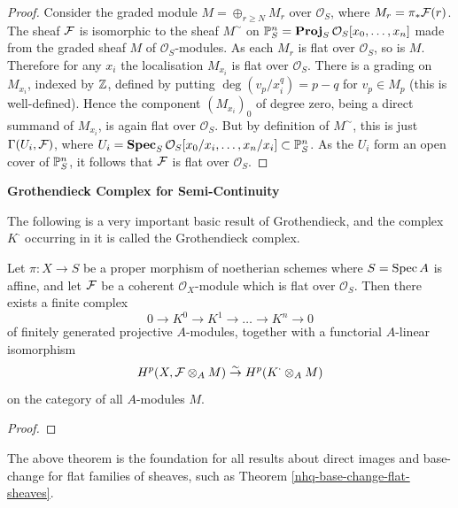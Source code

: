 \begin{proof} Consider the graded module $M = \oplus_{r\ge N} M_r$ over
${\mathcal O}_S$, where $M_r =  \pi_*\mathcal{F}(r)$. The sheaf $\mathcal{F}$ is isomorphic
to the sheaf $M^{\sim}$ on
$\mathbb{P}^n_S = {\bf Proj}_S\,{\mathcal O}_S[x_0,\ldots,x_n]$ made from the
graded sheaf $M$ of ${\mathcal O}_S$-modules.
As each $M_r$ is flat over ${\mathcal O}_S$, so is $M$. Therefore
for any $x_i$ the localisation $M_{x_i}$ is flat over ${\mathcal O}_S$.
There is a grading on $M_{x_i}$, indexed by $\mathbb{Z}$, defined
by putting $\deg(v_p/x_i^q) = p-q$ for $v_p \in M_p$ (this is well-defined).
Hence the component $(M_{x_i})_0$ of degree zero,
being a direct summand of $M_{x_i}$, is again
flat over ${\mathcal O}_S$. But by definition of $M^{\sim}$, this is just
$\Gamma(U_i,\mathcal{F})$, where $U_i = {\bf Spec}_S\,{\mathcal O}_S[x_0/x_i,\ldots,x_n/x_i]
\subset \mathbb{P}^n_S$. As the $U_i$ form an open cover of $\mathbb{P}^n_S$,
it follows that $\mathcal{F}$ is flat over ${\mathcal O}_S$. \end{proof}


\medskip

\centerline{\large\bf Grothendieck Complex for Semi-Continuity}

\medskip

The following is a very important basic result of Grothendieck,
and the complex $K^{\cdot}$ occurring in it is called the Grothendieck
complex.


\begin{theorem}\label{nhq-grothendieck-complex}
Let $\pi: X\to S$ be a proper morphism of noetherian
schemes where $S=\operatorname{Spec} A$ is affine,
and let $\mathcal{F}$ be a coherent ${\mathcal O}_X$-module
which is flat over ${\mathcal O}_S$. Then
there exists a finite complex
$$0\to K^0 \to K^1 \to \ldots \to K^n\to 0$$
of finitely generated projective $A$-modules, together with
a functorial $A$-linear isomorphism
$$H^p(X, \mathcal{F} \otimes_A M)
\stackrel{\sim}{\to} H^p(K^{\cdot}\otimes_A M)$$
on the category of all $A$-modules $M$.
\end{theorem}

\begin{proof}
\notready
\end{proof}


The above theorem is the foundation for all results about direct images and
base-change for flat families of sheaves, such as Theorem
\ref{nhq-base-change-flat-sheaves}.

